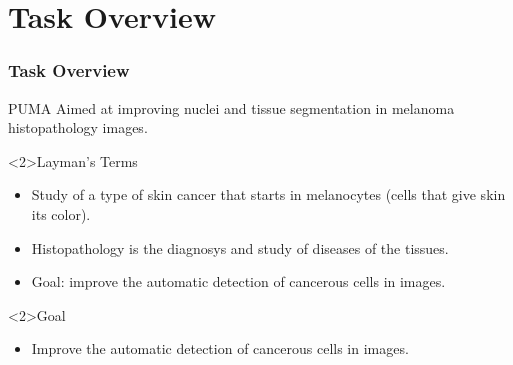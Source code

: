 \documentclass[../main.tex]{subfiles}
\begin{document}
\section{Task Overview}
\begin{frame}[t]
    \frametitle{Task Overview}

    \begin{block}{PUMA}
        Aimed at improving nuclei and tissue segmentation in melanoma histopathology images.
    \end{block}

    \begin{block}<2>{Layman's Terms}
        \begin{itemize}
            \item Study of a type of skin cancer that starts in melanocytes (cells that give skin its color).
            \item Histopathology is the diagnosys and study of diseases of the tissues.
            \item Goal: improve the automatic detection of cancerous cells in images.
        \end{itemize}
    \end{block}

    \begin{block}<2>{Goal}
        \begin{itemize}
            \item Improve the automatic detection of cancerous cells in images.
        \end{itemize}
    \end{block}
\end{frame}
\end{document}
